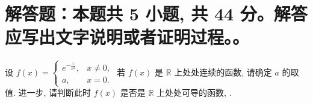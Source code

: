 




\section{解答题：本题共 5 小题, 共 44 分。解答应写出文字说明或者证明过程。。}



\begin{question}[points = 8]
设 $\displaystyle f(x) = \begin{cases}
e^{-\frac{1}{x^2}}, & x \neq 0, \\
a, & x = 0.
\end{cases}$ 若 $f(x)$ 是 $\mathbb{R}$ 上处处连续的函数, 请确定 $a$ 的取值. 进一步, 请判断此时 $f(x)$ 是否是 $\mathbb{R}$ 上处处可导的函数, .

\end{question}

